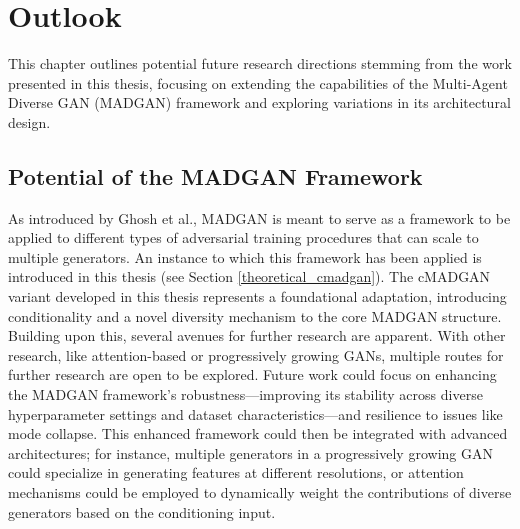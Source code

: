 \section{Outlook}\label{outlook}

This chapter outlines potential future research directions stemming from the work presented in this thesis, focusing on extending the capabilities of the Multi-Agent Diverse GAN (MADGAN) framework and exploring variations in its architectural design.
\subsection{Potential of the MADGAN Framework}
As introduced by Ghosh et al., MADGAN is meant to serve as a framework to be applied to different types of adversarial training procedures that can scale to multiple generators. An instance to which this framework has been applied is introduced in this thesis (see Section \ref{theoretical_cmadgan}). The cMADGAN variant developed in this thesis represents a foundational adaptation, introducing conditionality and a novel diversity mechanism to the core MADGAN structure. Building upon this, several avenues for further research are apparent. With other research, like attention-based or progressively growing GANs, multiple routes for further research are open to be explored. Future work could focus on enhancing the MADGAN framework's robustness—improving its stability across diverse hyperparameter settings and dataset characteristics—and resilience to issues like mode collapse. This enhanced framework could then be integrated with advanced architectures; for instance, multiple generators in a progressively growing GAN could specialize in generating features at different resolutions, or attention mechanisms could be employed to dynamically weight the contributions of diverse generators based on the conditioning input.

